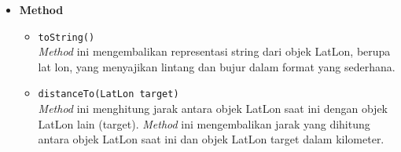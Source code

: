 \begin{itemize}
    \item \textbf{Method}
    \begin{itemize}
        \item \texttt{toString()}
        \\ \textit{Method} ini mengembalikan representasi string dari objek LatLon, berupa lat lon, yang menyajikan lintang dan bujur dalam format yang sederhana.
        \item \texttt{distanceTo(LatLon target)}
        \\ \textit{Method} ini menghitung jarak antara objek LatLon saat ini dengan objek LatLon lain (target). \textit{Method} ini mengembalikan jarak yang dihitung antara objek LatLon saat ini dan objek LatLon target dalam kilometer.
    \end{itemize}
\end{itemize}

